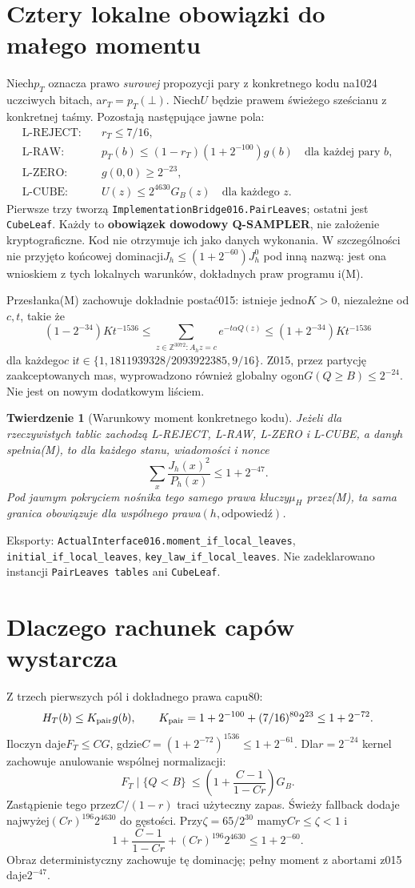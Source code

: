 \documentclass[11pt,a4paper]{article}
\newcommand{\code}[1]{\nolinkurl{#1}}
\newtheorem{theorem}{Twierdzenie}
\begin{document}
\section{Cztery lokalne obowiązki do małego momentu}
Niech$p_T$ oznacza prawo \emph{surowej} propozycji pary z konkretnego kodu
na1024 uczciwych bitach, a$r_T=p_T(\bot)$. Niech$U$ będzie prawem świeżego
sześcianu z konkretnej taśmy. Pozostają następujące jawne pola:
\begin{align*}
 \text{L-REJECT:}\quad&r_T\le7/16,\\
 \text{L-RAW:}\quad&p_T(b)\le(1-r_T)(1+2^{-100})g(b)\quad\text{dla każdej pary }b,\\
 \text{L-ZERO:}\quad&g(0,0)\ge2^{-23},\\
 \text{L-CUBE:}\quad&U(z)\le2^{4630}G_B(z)\quad\text{dla każdego }z.
\end{align*}
Pierwsze trzy tworzą \code{ImplementationBridge016.PairLeaves}; ostatni
jest \code{CubeLeaf}. Każdy to \textbf{obowiązek dowodowy Q-SAMPLER},
nie założenie kryptograficzne. Kod nie otrzymuje ich jako danych wykonania.
W szczególności nie przyjęto końcowej dominacji$J_h\le(1+2^{-60})J_h^0$
pod inną nazwą: jest ona wnioskiem z tych lokalnych warunków, dokładnych
praw programu i(M).

Przesłanka(M) zachowuje dokładnie postać015: istnieje jedno$K>0$,
niezależne od$c,t$, takie że
\[
 (1-2^{-34})Kt^{-1536}\le\sum_{z\in\mathbb Z^{3072}:A_hz=c}e^{-t\alpha Q(z)}
 \le(1+2^{-34})Kt^{-1536}
\]
dla każdego$c$ i$t\in\{1,1811939328/2093922385,9/16\}$.
Z015, przez partycję zaakceptowanych mas, wyprowadzono również globalny
ogon$G(Q\ge B)\le2^{-24}$. Nie jest on nowym dodatkowym liściem.

\begin{theorem}[Warunkowy moment konkretnego kodu]
Jeżeli dla rzeczywistych tablic zachodzą L-REJECT, L-RAW, L-ZERO i L-CUBE,
a dany$h$ spełnia(M), to dla każdego stanu, wiadomości i nonce
\[
 \sum_x\frac{J_h(x)^2}{P_h(x)}\le1+2^{-47}.
\]
Pod jawnym pokryciem nośnika tego samego prawa kluczy$\mu_H$ przez(M),
ta sama granica obowiązuje dla wspólnego prawa$(h,\text{odpowiedź})$.
\end{theorem}
Eksporty: \code{ActualInterface016.moment_if_local_leaves},
\code{initial_if_local_leaves}, \code{key_law_if_local_leaves}.
Nie zadeklarowano instancji \code{PairLeaves tables} ani \code{CubeLeaf}.

\section{Dlaczego rachunek capów wystarcza}
Z trzech pierwszych pól i dokładnego prawa capu80:
\[
 H_T(b)\le K_{\rm pair}g(b),\qquad
 K_{\rm pair}=1+2^{-100}+(7/16)^{80}2^{23}\le1+2^{-72}.
\]
Iloczyn daje$F_T\le CG$, gdzie$C=(1+2^{-72})^{1536}\le1+2^{-61}$.
Dla$r=2^{-24}$ kernel zachowuje anulowanie wspólnej normalizacji:
\[
 F_T\mid\{Q<B\}\ \le
 \left(1+\frac{C-1}{1-Cr}\right)G_B.
\]
Zastąpienie tego przez$C/(1-r)$ traci użyteczny zapas.
Świeży fallback dodaje najwyżej$(Cr)^{196}2^{4630}$ do gęstości.
Przy$\zeta=65/2^{30}$ mamy$Cr\le\zeta<1$ i
\[
 1+\frac{C-1}{1-Cr}+(Cr)^{196}2^{4630}\le1+2^{-60}.
\]
Obraz deterministyczny zachowuje tę dominację; pełny moment z abortami
z015 daje$2^{-47}$.
\end{document}
